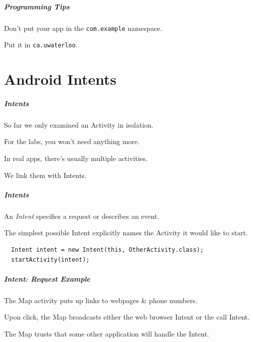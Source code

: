 \begin{frame}
\frametitle{Programming Tips}
\begin{changemargin}{1cm}

Don't put your app in the {\tt com.example} namespace. 

Put it in {\tt ca.uwaterloo}.
\end{changemargin}
\end{frame}

\part{Android Intents}
\frame{\partpage}

\begin{frame}
\frametitle{Intents}
\begin{changemargin}{1cm}

So far we only examined an Activity in isolation.

For the labs, you won't need anything more.

In real apps, there's usually multiple activities.

We link them with Intents.

\end{changemargin}
\end{frame}

\begin{frame}[fragile]
\frametitle{Intents}
\begin{changemargin}{1cm}

An \emph{Intent} specifies a request or describes an event.

The simplest possible Intent
explicitly names the Activity it would like to start.

{\small 
\begin{lstlisting}
  Intent intent = new Intent(this, OtherActivity.class);
  startActivity(intent);
\end{lstlisting}
}


\end{changemargin}
\end{frame}


\begin{frame}
\frametitle{Intent: Request Example}
\begin{changemargin}{1cm}


The Map activity puts up links to webpages 
\& phone numbers. 

Upon click, the Map broadcasts either the web browser
Intent or the call Intent.

The Map trusts that some other application will handle the Intent.
\end{changemargin}
\end{frame}



